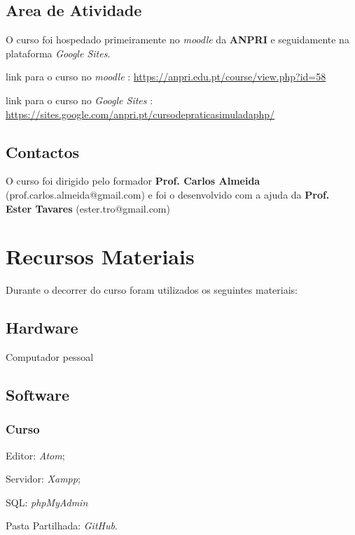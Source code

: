 \documentclass[14pt]{article}
\begin{document}
\subsection{Area de Atividade}
O curso foi hospedado primeiramente no \textit{moodle} da \textbf{ANPRI} e seguidamente na plataforma \textit{Google Sites}.

link para o curso no \textit{moodle} : \url{https://anpri.edu.pt/course/view.php?id=58}

link para o curso no \textit{Google Sites} : \url{https://sites.google.com/anpri.pt/cursodepraticasimuladaphp/}

\subsection{Contactos}
O curso foi dirigido pelo formador \textbf{Prof. Carlos Almeida} (prof.carlos.almeida@gmail.com) e foi o desenvolvido com a ajuda da \textbf{Prof. Ester Tavares} (ester.tro@gmail.com)

\section{Recursos Materiais}
Durante o decorrer do curso foram utilizados os seguintes materiais:

\subsection{Hardware}
\begin{list}{•}
\item Computador pessoal
\end{list}

\subsection{Software}

\subsubsection{Curso}
\begin{list}{•}
\item Editor: \textit{Atom};
\item
\item Servidor: \textit{Xampp};
\item SQL: \textit{phpMyAdmin}
\item Pasta Partilhada: \textit{GitHub}.
\end{list}
\end{document}
